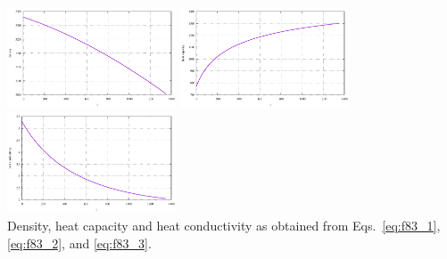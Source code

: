 \begin{center}
\includegraphics[width=5cm]{python_codes/fieldstone_83/results_model2/rho.pdf}
\includegraphics[width=5cm]{python_codes/fieldstone_83/results_model2/hcapa.pdf}
\includegraphics[width=5cm]{python_codes/fieldstone_83/results_model2/hcond.pdf}\\
{\captionfont Density, heat capacity and heat conductivity as obtained from Eqs.~\eqref{eq:f83_1}, \eqref{eq:f83_2}, and \eqref{eq:f83_3}.}
\end{center}


